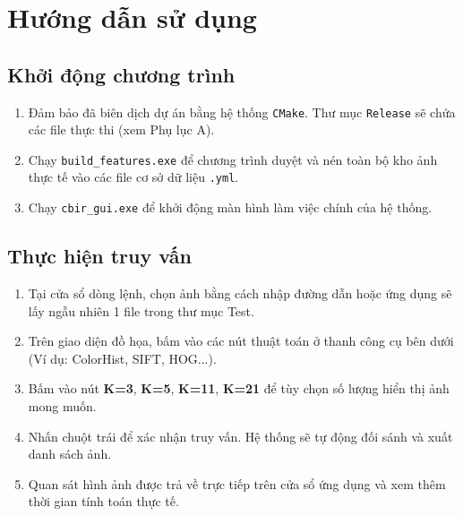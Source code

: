 \chapter{Hướng dẫn sử dụng}

\section{Khởi động chương trình}
\begin{enumerate}
    \item Đảm bảo đã biên dịch dự án bằng hệ thống \texttt{CMake}. Thư mục \texttt{Release} sẽ chứa các file thực thi (xem Phụ lục A).
    \item Chạy \texttt{build\_features.exe} để chương trình duyệt và nén toàn bộ kho ảnh thực tế vào các file cơ sở dữ liệu \texttt{.yml}.
    \item Chạy \texttt{cbir\_gui.exe} để khởi động màn hình làm việc chính của hệ thống. 
\end{enumerate}

\section{Thực hiện truy vấn}
\begin{enumerate}
    \item Tại cửa sổ dòng lệnh, chọn ảnh bằng cách nhập đường dẫn hoặc ứng dụng sẽ lấy ngẫu nhiên 1 file trong thư mục Test.
    \item Trên giao diện đồ họa, bấm vào các nút thuật toán ở thanh công cụ bên dưới (Ví dụ: ColorHist, SIFT, HOG...).
    \item Bấm vào nút \textbf{K=3}, \textbf{K=5}, \textbf{K=11}, \textbf{K=21} để tùy chọn số lượng hiển thị ảnh mong muốn.
    \item Nhấn chuột trái để xác nhận truy vấn. Hệ thống sẽ tự động đối sánh và xuất danh sách ảnh.
    \item Quan sát hình ảnh được trả về trực tiếp trên cửa sổ ứng dụng và xem thêm thời gian tính toán thực tế.
\end{enumerate}


